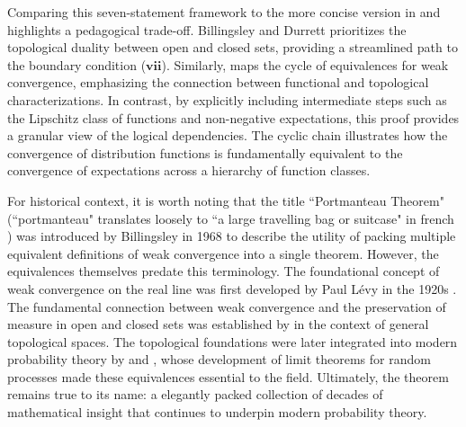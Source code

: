 \documentclass[11pt]{article}
\begin{document}
Comparing this seven-statement framework to the more concise version in \citet{Billingsley1999} and \citet{durrett:2019} highlights a pedagogical trade-off. Billingsley and Durrett prioritizes the topological duality between open and closed sets, providing a streamlined path to the boundary condition ($\mathbf{vii}$). Similarly, \citet{Pollard_2001} maps the cycle of equivalences for weak convergence, emphasizing the connection between functional and topological characterizations. In contrast, by explicitly including intermediate steps such as the Lipschitz class of functions and non-negative expectations, this proof provides a granular view of the logical dependencies. The cyclic chain illustrates how the convergence of distribution functions is fundamentally equivalent to the convergence of expectations across a hierarchy of function classes.

For historical context, it is worth noting that the title ``Portmanteau Theorem" (``portmanteau" translates loosely to ``a large travelling bag or suitcase" in french \citep{mathematics_se}) was introduced by Billingsley in 1968 to describe the utility of packing multiple equivalent definitions of weak convergence into a single theorem. However, the equivalences themselves predate this terminology. The foundational concept of weak convergence on the real line was first developed by Paul L\'evy in the 1920s \citep{levy1925calcul}. The fundamental connection between weak convergence and the preservation of measure in open and closed sets was established by \citet{Alexandroff1943} in the context of general topological spaces. The topological foundations were later integrated into modern probability theory by \citet{Prokhorov1956} and \citet{Skorokhod1956}, whose development of limit theorems for random processes made these equivalences essential to the field. Ultimately, the theorem remains true to its name: a elegantly packed collection of decades of mathematical insight that continues to underpin modern probability theory.


\end{document}
